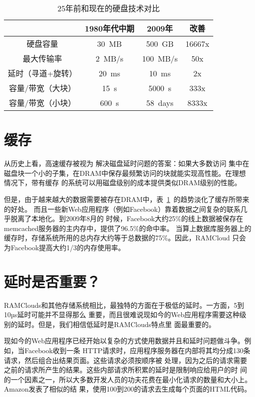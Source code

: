 \documentclass[translation]{zjutreport}
\begin{document}
\begin{table}[htbp]
\caption{25年前和现在的硬盘技术对比}\label{tab:table2}
\vspace{0.5em}
\begin{center}
{\wuhao
\begin{tabular}{cccc}
\toprule[1.5pt]
 & 1980年代中期 & 2009年 & 改善\\
\midrule[1pt]
硬盘容量 & 30~MB & 500~GB & 16667x\\
最大传输率 & 2~MB/s & 100~MB/s & 50x \\
延时（寻道+旋转）& 20~ms & 10~ms & 2x \\
容量/带宽（大块） & 15~s & 5000~s & 333x \\
容量/带宽（小块） & 600~s & 58~days & 8333x \\
\bottomrule[1.5pt]
\end{tabular}}
\end{center}
\vspace{\baselineskip}
\end{table}

\section{缓存}
从历史上看，高速缓存被视为
解决磁盘延时问题的答案：如果大多数访问
集中在磁盘块一个小的子集，在DRAM中保存最频繁访问的块就能实现高性能。在理想情况下，带有缓存
的系统可以用磁盘级别的成本提供类似DRAM级别的性能。

但是，由于越来越大的数据需要被存在DRAM中，表~\ref{tab:table2}~的趋势淡化了缓存所带来的好处。
而且一些新Web应用程序（例如Facebook）靠着数据之间复杂的联系几乎脱离了本地化。到2009年8月的
时候，Facebook大约25\%的线上数据被保存在memcached服务器的主内存中，提供了96.5\%的命中率。
当算上数据库服务器上的缓存时，存储系统所用的总内存大约等于总数据的75\%。因此，RAMCloud
只会为Facebook提高大约1/3的内存使用率。

\section{延时是否重要？}
RAMClouds和其他存储系统相比，最独特的方面在于极低的延时。一方面，5到10µs延时可能并不显得那么
重要，而且很难说现如今的Web应用程序需要这种级别的延时。但是，我们相信低延时是RAMClouds特点里
面最重要的。

现如今的Web应用程序已经开始以复杂的方式使用数据并且和延时问题做斗争。例如，当Facebook收到一条
HTTP请求时，应用程序服务器在内部将其均分成130条请求，然后组合出结果页面。这些请求必须按顺序被
处理，因为之后的请求需要之前的请求所产生的结果。这些内部请求所积累的延时是限制响应给用户的时
间的一个因素之一，所以大多数开发人员的功夫花费在最小化请求的数量和大小上。Amazon发表了相似的结
果，使用100到200的请求去生成每个页面的HTML代码。
\end{document}
